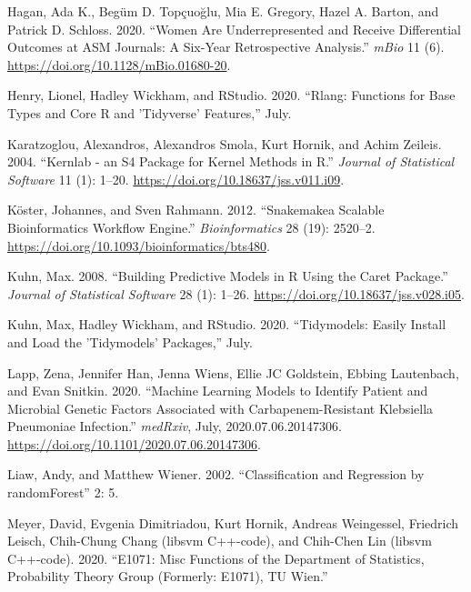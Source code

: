 \documentclass[
]{article}
\begin{document}
\leavevmode\hypertarget{ref-hagan_women_2020}{}%
Hagan, Ada K., Begüm D. Topçuoğlu, Mia E. Gregory, Hazel A. Barton, and
Patrick D. Schloss. 2020. ``Women Are Underrepresented and Receive
Differential Outcomes at ASM Journals: A Six-Year Retrospective
Analysis.'' \emph{mBio} 11 (6).
\url{https://doi.org/10.1128/mBio.01680-20}.

\leavevmode\hypertarget{ref-henry_rlang_2020}{}%
Henry, Lionel, Hadley Wickham, and RStudio. 2020. ``Rlang: Functions for
Base Types and Core R and 'Tidyverse' Features,'' July.

\leavevmode\hypertarget{ref-karatzoglou_kernlab_2004}{}%
Karatzoglou, Alexandros, Alexandros Smola, Kurt Hornik, and Achim
Zeileis. 2004. ``Kernlab - an S4 Package for Kernel Methods in R.''
\emph{Journal of Statistical Software} 11 (1): 1--20.
\url{https://doi.org/10.18637/jss.v011.i09}.

\leavevmode\hypertarget{ref-koster_snakemakescalable_2012}{}%
Köster, Johannes, and Sven Rahmann. 2012. ``Snakemakea Scalable
Bioinformatics Workflow Engine.'' \emph{Bioinformatics} 28 (19):
2520--2. \url{https://doi.org/10.1093/bioinformatics/bts480}.

\leavevmode\hypertarget{ref-kuhn_building_2008}{}%
Kuhn, Max. 2008. ``Building Predictive Models in R Using the Caret
Package.'' \emph{Journal of Statistical Software} 28 (1): 1--26.
\url{https://doi.org/10.18637/jss.v028.i05}.

\leavevmode\hypertarget{ref-kuhn_tidymodels_2020}{}%
Kuhn, Max, Hadley Wickham, and RStudio. 2020. ``Tidymodels: Easily
Install and Load the 'Tidymodels' Packages,'' July.

\leavevmode\hypertarget{ref-lapp_machine_2020}{}%
Lapp, Zena, Jennifer Han, Jenna Wiens, Ellie JC Goldstein, Ebbing
Lautenbach, and Evan Snitkin. 2020. ``Machine Learning Models to
Identify Patient and Microbial Genetic Factors Associated with
Carbapenem-Resistant Klebsiella Pneumoniae Infection.'' \emph{medRxiv},
July, 2020.07.06.20147306.
\url{https://doi.org/10.1101/2020.07.06.20147306}.

\leavevmode\hypertarget{ref-liaw_classication_2002}{}%
Liaw, Andy, and Matthew Wiener. 2002. ``Classification and Regression by
randomForest'' 2: 5.

\leavevmode\hypertarget{ref-meyer_e1071_2020}{}%
Meyer, David, Evgenia Dimitriadou, Kurt Hornik, Andreas Weingessel,
Friedrich Leisch, Chih-Chung Chang (libsvm C++-code), and Chih-Chen Lin
(libsvm C++-code). 2020. ``E1071: Misc Functions of the Department of
Statistics, Probability Theory Group (Formerly: E1071), TU Wien.''
\end{document}
